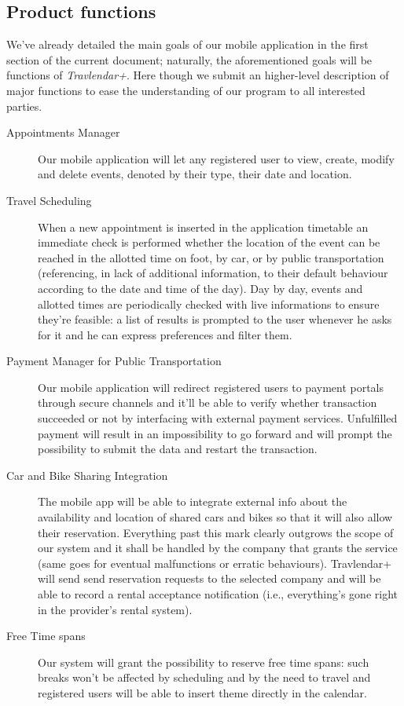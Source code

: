 			
	\subsection{Product functions}
	
 		We’ve already detailed the main goals of our mobile application in the first section of the current document; naturally, the aforementioned goals will be functions of \textit{Travlendar+}.
 		Here though we submit an higher-level description of major functions to ease the understanding of our program to all interested parties.
		
		\begin{description}
			\item[Appointments Manager]
			Our mobile application will let any registered user to view, create, modify and delete events, denoted by their type, their date and location.

			\item[Travel Scheduling] 
			When a new appointment is inserted in the application timetable an immediate check is performed whether the location of the event can be reached in the allotted time on foot, by car, or by public transportation (referencing, in lack of additional information, to their default behaviour according to the date and time of the day).
			Day by day, events and allotted times are periodically checked with live informations to ensure they’re feasible: a list of results is prompted to the user whenever he asks for it and he can express preferences and filter them.
			
			\item[Payment Manager for Public Transportation]
			Our mobile application will redirect registered users to payment portals through secure channels and it’ll be able to verify whether transaction succeeded or not by interfacing with external payment services.
			Unfulfilled payment will result in an impossibility to go forward and will prompt the possibility to submit the data and restart the transaction.

			\item[Car and Bike Sharing Integration]
			The mobile app will be able to integrate external info about the availability and location of shared cars and bikes so that it will also allow their reservation.
			Everything past this mark clearly outgrows the scope of our system and it shall be handled by the company that grants the service (same goes for eventual malfunctions or erratic behaviours). 
			Travlendar+ will send send reservation requests to the selected company and will be able to record a rental acceptance notification (i.e., everything’s gone right in the provider’s rental system).
			
			\item[Free Time spans]
			Our system will grant the possibility to reserve free time spans: such breaks won’t be affected by scheduling and by the need to travel and registered users will be able to insert theme directly in the calendar.

		\end{description}


